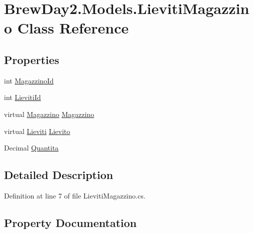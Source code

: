 \hypertarget{class_brew_day2_1_1_models_1_1_lieviti_magazzino}{}\section{Brew\+Day2.\+Models.\+Lieviti\+Magazzino Class Reference}
\label{class_brew_day2_1_1_models_1_1_lieviti_magazzino}
\subsection*{Properties}
\begin{DoxyCompactItemize}
\item 
int \mbox{\hyperlink{class_brew_day2_1_1_models_1_1_lieviti_magazzino_a5ca7208713c4862deb3b9a245c40fa1b}{Magazzino\+Id}}
\item 
int \mbox{\hyperlink{class_brew_day2_1_1_models_1_1_lieviti_magazzino_abee920b2bca9c700fc22bd46b4f8d526}{Lieviti\+Id}}
\item 
virtual \mbox{\hyperlink{class_brew_day2_1_1_models_1_1_magazzino}{Magazzino}} \mbox{\hyperlink{class_brew_day2_1_1_models_1_1_lieviti_magazzino_afa1032de3797d122a0f4285b068939fb}{Magazzino}}
\item 
virtual \mbox{\hyperlink{class_brew_day2_1_1_models_1_1_lieviti}{Lieviti}} \mbox{\hyperlink{class_brew_day2_1_1_models_1_1_lieviti_magazzino_a900223bc2a1c7564c2e74bf92aabce6f}{Lievito}}
\item 
Decimal \mbox{\hyperlink{class_brew_day2_1_1_models_1_1_lieviti_magazzino_ae7947ec29c47d645898ff41d434f6c24}{Quantita}}
\end{DoxyCompactItemize}


\subsection{Detailed Description}


Definition at line 7 of file Lieviti\+Magazzino.\+cs.



\subsection{Property Documentation}
\mbox{\label{class_brew_day2_1_1_models_1_1_lieviti_magazzino_abee920b2bca9c700fc22bd46b4f8d526}} 
